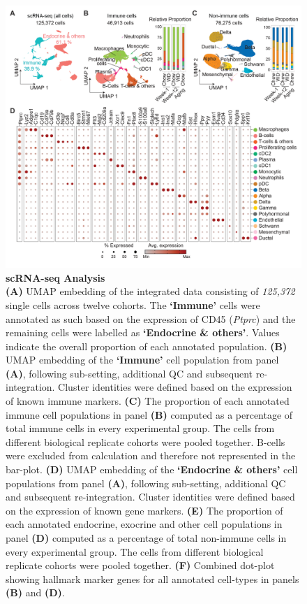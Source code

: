 \begin{figure}[htbp]
\centering
\includegraphics[width=\linewidth]{Chapter4/Fig/F2-3-01.png}
\caption[res-scR]{\textbf{scRNA-seq Analysis}\\
\textbf{(A)} UMAP embedding of the integrated data consisting of \textit{125,372} single cells across twelve cohorts. The \textbf{‘Immune’} cells were annotated as such based on the expression of CD45 (\textit{Ptprc}) and the remaining cells were labelled as \textbf{‘Endocrine \& others’}. Values indicate the overall proportion of each annotated population. \textbf{(B)} UMAP embedding of the \textbf{‘Immune’} cell population from panel \textbf{(A)}, following sub-setting, additional QC and subsequent re-integration. Cluster identities were defined based on the expression of known immune markers. \textbf{(C)} The proportion of each annotated immune cell populations in panel \textbf{(B)} computed as a percentage of total immune cells in every experimental group. The cells from different biological replicate cohorts were pooled together. B-cells were excluded from calculation and therefore not represented in the bar-plot. \textbf{(D)} UMAP embedding of the \textbf{‘Endocrine \& others’} cell populations from panel \textbf{(A)}, following sub-setting, additional QC and subsequent re-integration. Cluster identities were defined based on the expression of known gene markers. \textbf{(E)} The proportion of each annotated endocrine, exocrine and other cell populations in panel \textbf{(D)} computed as a percentage of total non-immune cells in every experimental group. The cells from different biological replicate cohorts were pooled together. \textbf{(F)} Combined dot-plot showing hallmark  marker genes for all annotated cell-types in panels \textbf{(B)} and \textbf{(D)}.}
\label{fig2-3}
\end{figure}

